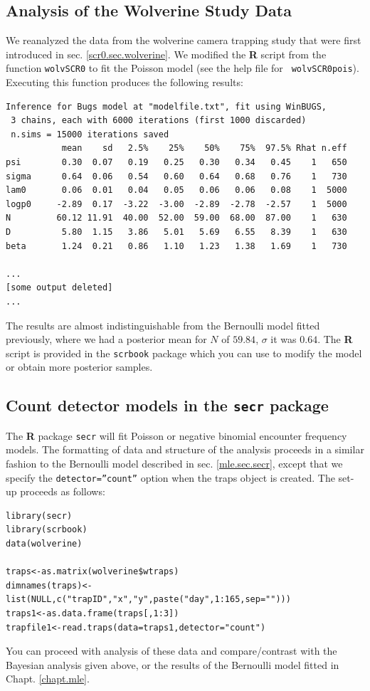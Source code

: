 \subsection{Analysis of the Wolverine Study Data}

We reanalyzed the data from the wolverine camera trapping study that
were first introduced in sec. \ref{scr0.sec.wolverine}.  We modified
the {\bf R} script from the function \mbox{\tt wolvSCR0} to fit the
Poisson model (see the help file for \mbox{\tt
  wolvSCR0pois}). Executing this function produces the following
results: {\small
\begin{verbatim}
Inference for Bugs model at "modelfile.txt", fit using WinBUGS,
 3 chains, each with 6000 iterations (first 1000 discarded)
 n.sims = 15000 iterations saved
           mean    sd   2.5%    25%    50%    75%  97.5% Rhat n.eff
psi        0.30  0.07   0.19   0.25   0.30   0.34   0.45    1   650
sigma      0.64  0.06   0.54   0.60   0.64   0.68   0.76    1   730
lam0       0.06  0.01   0.04   0.05   0.06   0.06   0.08    1  5000
logp0     -2.89  0.17  -3.22  -3.00  -2.89  -2.78  -2.57    1  5000
N         60.12 11.91  40.00  52.00  59.00  68.00  87.00    1   630
D          5.80  1.15   3.86   5.01   5.69   6.55   8.39    1   630
beta       1.24  0.21   0.86   1.10   1.23   1.38   1.69    1   730

...
[some output deleted]
...
\end{verbatim}
}
The results are almost indistinguishable from the Bernoulli model
fitted previously, where we had a posterior mean for $N$ of
 $59.84$,  $\sigma$ it was
$0.64$. The {\bf R} 
script is provided in the  \mbox{\tt scrbook} package which you can
use to modify the model or obtain more posterior samples.

\subsection{Count detector models in the  \mbox{\tt secr} package}

The {\bf R} package \mbox{\tt secr} will fit Poisson or negative
binomial encounter frequency models. The formatting of data and
structure of the analysis proceeds in a similar fashion to the
Bernoulli model described in sec. \ref{mle.sec.secr}, except that 
we specify the \mbox{\tt detector=''count''} option when the traps
object is created. The set-up proceeds as follows:
{\small
\begin{verbatim}
library(secr)
library(scrbook)
data(wolverine)

traps<-as.matrix(wolverine$wtraps)
dimnames(traps)<-list(NULL,c("trapID","x","y",paste("day",1:165,sep="")))
traps1<-as.data.frame(traps[,1:3])
trapfile1<-read.traps(data=traps1,detector="count")
\end{verbatim}
}
You can proceed with analysis of these data and compare/contrast with
the Bayesian analysis given above, or the results of the Bernoulli
model fitted in Chapt. \ref{chapt.mle}.



